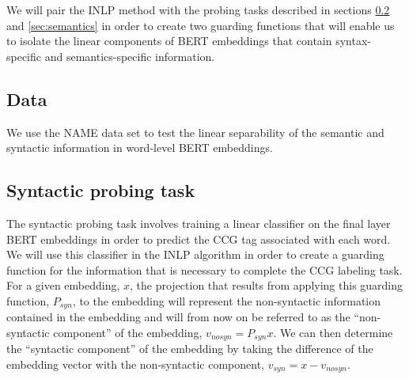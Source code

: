 \documentclass[11pt,a4paper]{article}
\begin{document}
We will pair the INLP method with the probing tasks described in sections \ref{sec:syntactic} and \ref{sec:semantics} in order to create two guarding functions that will enable us to isolate the linear components of BERT embeddings that contain syntax-specific and semantics-specific information. 


\subsection{Data}
\label{sec:data}


We use the NAME data set to test the linear separability of the semantic and syntactic information in word-level BERT embeddings. %


\subsection{Syntactic probing task}
\label{sec:syntactic}

The syntactic probing task involves training a linear classifier on the final layer BERT embeddings in order to predict the CCG tag associated with each word. We will use this classifier in the INLP algorithm in order to create a guarding function for the information that is necessary to complete the CCG labeling task. For a given embedding, $x$, the projection that results from applying this guarding function, $P_{syn}$, to the embedding will represent the non-syntactic information contained in the embedding and will from now on be referred to as the ``non-syntactic component'' of the embedding, $v_{no syn} = P_{syn} x$. We can then determine the ``syntactic component'' of the embedding by taking the difference of the embedding vector with the non-syntactic component, $v_{syn} = x - v_{no syn}$.
\end{document}
